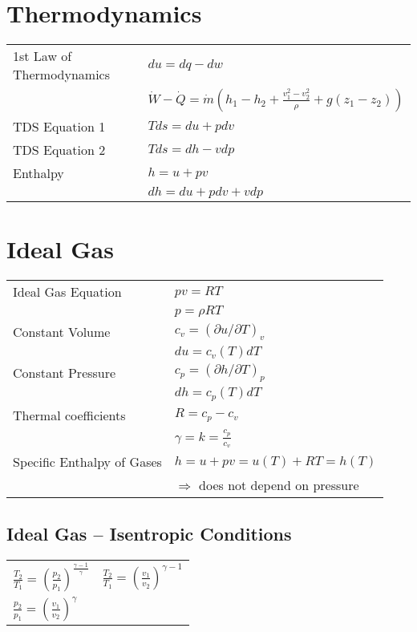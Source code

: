 \section*{Thermodynamics}
\begin{tabular}{ m{5cm} l}
    1st Law of Thermodynamics & $du = dq - dw$  \\
     & $\dot{W} - \dot{Q} = \dot{m} \left( h_1 - h_2 + \frac{v_1^2 - v_2^2}{\rho} + g \left(z_1 - z_2 \right) \right)$ \\
    TDS Equation 1 & $Tds = du + pdv$ \\
    TDS Equation 2 & $Tds = dh - vdp$ \\
    Enthalpy & $h = u + pv$ \\
     & $d h  = du + p dv + v dp$ \\
\end{tabular}

\section*{Ideal Gas}
\begin{tabular}{ m{5cm} l}
    Ideal Gas Equation & $pv = RT$ \\
     & $p = \rho R T$ \\
    Constant Volume & $c_v = (\partial u / \partial T)_v$ \\
     & $du = c_v (T) dT$ \\
     Constant Pressure & $c_p = (\partial h / \partial T)_p$ \\
     & $dh = c_p (T) dT$ \\
     Thermal coefficients & $R = c_p - c_v$ \\
      & $\gamma = k = \frac{c_p}{c_v}$ \\
      Specific Enthalpy of Gases & $h = u + pv = u(T) + RT = h(T)$ \\
       & $\Rightarrow$ does not depend on pressure
\end{tabular}

\subsection*{Ideal Gas – Isentropic Conditions}
\begin{tabular}{ m{5cm} l}
    $\frac{T_2}{T_1} = \left( \frac{p_2}{p_1} \right)^{ \frac{\gamma - 1}{\gamma}} $ & $\frac{T_2}{T_1} = \left( \frac{v_1}{v_2} \right)^{ \gamma -1 } $ \\
    $\frac{p_2}{p_1} = \left( \frac{v_1}{v_2} \right)^{ \gamma } $ & \\
\end{tabular}\\

